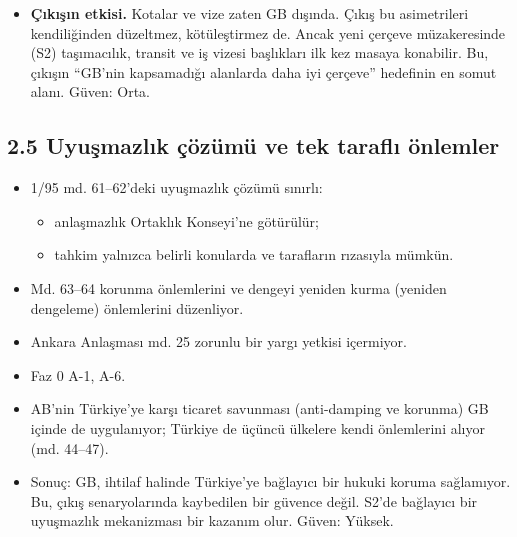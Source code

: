 \begin{itemize}
  \begin{itemize}
  \tightlist
  \item
    2025'te AB27'ye karayolu yük taşımacılığı ihracatı \$3,8 mlr; Türkiye'nin karayolu yük hizmetleri ihracatının \%56,7'si.
  \item
    AB27 ile taşımacılık dengesi +\$9,9 mlr. \etiketV{} TÜİK, §3.5.
  \end{itemize}
\item
  \textbf{Çıkışın etkisi.} Kotalar ve vize zaten GB dışında. Çıkış bu asimetrileri kendiliğinden düzeltmez, kötüleştirmez de. Ancak yeni çerçeve müzakeresinde (S2) taşımacılık, transit ve iş vizesi başlıkları ilk kez masaya konabilir. Bu, çıkışın ``GB'nin kapsamadığı alanlarda daha iyi çerçeve'' hedefinin en somut alanı. \etiketH{} Güven: Orta.
\end{itemize}

\hypertarget{01_teshis-25-uyuux15fmazlux131k-uxe7uxf6zuxfcmuxfc-ve-tek-taraflux131-uxf6nlemler}{%
\subsection{2.5 Uyuşmazlık çözümü ve tek taraflı önlemler}\label{01_teshis-25-uyuux15fmazlux131k-uxe7uxf6zuxfcmuxfc-ve-tek-taraflux131-uxf6nlemler}}

\begin{itemize}
\tightlist
\item
  1/95 md. 61--62'deki uyuşmazlık çözümü sınırlı:

  \begin{itemize}
  \tightlist
  \item
    anlaşmazlık Ortaklık Konseyi'ne götürülür;
  \item
    tahkim yalnızca belirli konularda ve tarafların rızasıyla mümkün.
  \end{itemize}
\item
  Md. 63--64 korunma önlemlerini ve dengeyi yeniden kurma (yeniden dengeleme) önlemlerini düzenliyor.
\item
  Ankara Anlaşması md. 25 zorunlu bir yargı yetkisi içermiyor.
\item
  \etiketV{} Faz 0 A-1, A-6.
\item
  AB'nin Türkiye'ye karşı ticaret savunması (anti-damping ve korunma) GB içinde de uygulanıyor; Türkiye de üçüncü ülkelere kendi önlemlerini alıyor (md. 44--47).
\item
  Sonuç: GB, ihtilaf halinde Türkiye'ye bağlayıcı bir hukuki koruma sağlamıyor. Bu, çıkış senaryolarında kaybedilen bir güvence değil. S2'de bağlayıcı bir uyuşmazlık mekanizması bir kazanım olur. \etiketH{} Güven: Yüksek.
\end{itemize}

